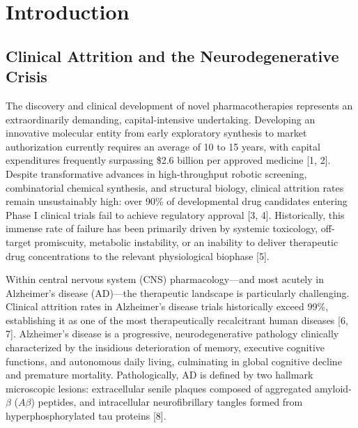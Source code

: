 \documentclass[10pt,a4paper]{article}
\begin{document}
\vspace{0.35cm}
\section{Introduction}

\subsection{Clinical Attrition and the Neurodegenerative Crisis}
The discovery and clinical development of novel pharmacotherapies represents an extraordinarily demanding, capital-intensive undertaking. Developing an innovative molecular entity from early exploratory synthesis to market authorization currently requires an average of 10 to 15 years, with capital expenditures frequently surpassing \$2.6 billion per approved medicine [1, 2]. Despite transformative advances in high-throughput robotic screening, combinatorial chemical synthesis, and structural biology, clinical attrition rates remain unsustainably high: over 90\% of developmental drug candidates entering Phase I clinical trials fail to achieve regulatory approval [3, 4]. Historically, this immense rate of failure has been primarily driven by systemic toxicology, off-target promiscuity, metabolic instability, or an inability to deliver therapeutic drug concentrations to the relevant physiological biophase [5].

Within central nervous system (CNS) pharmacology---and most acutely in Alzheimer's disease (AD)---the therapeutic landscape is particularly challenging. Clinical attrition rates in Alzheimer's disease trials historically exceed 99\%, establishing it as one of the most therapeutically recalcitrant human diseases [6, 7]. Alzheimer's disease is a progressive, neurodegenerative pathology clinically characterized by the insidious deterioration of memory, executive cognitive functions, and autonomous daily living, culminating in global cognitive decline and premature mortality. Pathologically, AD is defined by two hallmark microscopic lesions: extracellular senile plaques composed of aggregated amyloid-$\beta$ ($A\beta$) peptides, and intracellular neurofibrillary tangles formed from hyperphosphorylated tau proteins [8].
\end{document}
